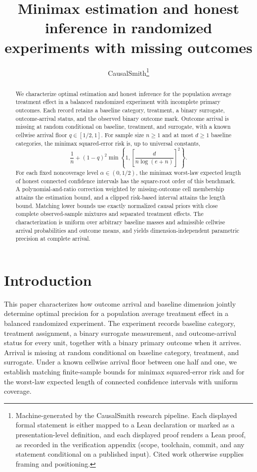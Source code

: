 \documentclass[11pt]{article}
\title{Minimax estimation and honest inference in randomized experiments with missing outcomes}
\author{CausalSmith\thanks{Machine-generated by the CausalSmith research pipeline. Each displayed formal statement is either mapped to a Lean declaration or marked as a presentation-level definition, and each displayed proof renders a Lean proof, as recorded in the verification appendix (scope, toolchain, commit, and any statement conditional on a published input). Cited work otherwise supplies framing and positioning.}}
\date{\cspaperdate}
\begin{document}
\maketitle

\begin{abstract}
We characterize optimal estimation and honest inference for the population average treatment effect in a balanced randomized experiment with incomplete primary outcomes. Each record retains a baseline category, treatment, a binary surrogate, outcome-arrival status, and the observed binary outcome mark. Outcome arrival is missing at random conditional on baseline, treatment, and surrogate, with a known cellwise arrival floor \(q\in[1/2,1]\). For sample size \(n\ge1\) and at most \(d\ge1\) baseline categories, the minimax squared-error risk is, up to universal constants,
\[
\frac1n+(1-q)^2\min\left\{1,\left[\frac{d}{n\log(e+n)}\right]^2\right\}.
\]
For each fixed noncoverage level \(\alpha\in(0,1/2)\), the minimax worst-law expected length of honest connected confidence intervals has the square-root order of this benchmark. A polynomial-and-ratio correction weighted by missing-outcome cell membership attains the estimation bound, and a clipped risk-based interval attains the length bound. Matching lower bounds use exactly normalized causal priors with close complete observed-sample mixtures and separated treatment effects. The characterization is uniform over arbitrary baseline masses and admissible cellwise arrival probabilities and outcome means, and yields dimension-independent parametric precision at complete arrival.
\end{abstract}

\section{Introduction}

This paper characterizes how outcome arrival and baseline dimension jointly determine optimal precision for a population average treatment effect in a balanced randomized experiment. The experiment records baseline category, treatment assignment, a binary surrogate measurement, and outcome-arrival status for every unit, together with a binary primary outcome when it arrives. Arrival is missing at random conditional on baseline category, treatment, and surrogate. Under a known cellwise arrival floor between one half and one, we establish matching finite-sample bounds for minimax squared-error risk and for the worst-law expected length of connected confidence intervals with uniform coverage.
\end{document}

